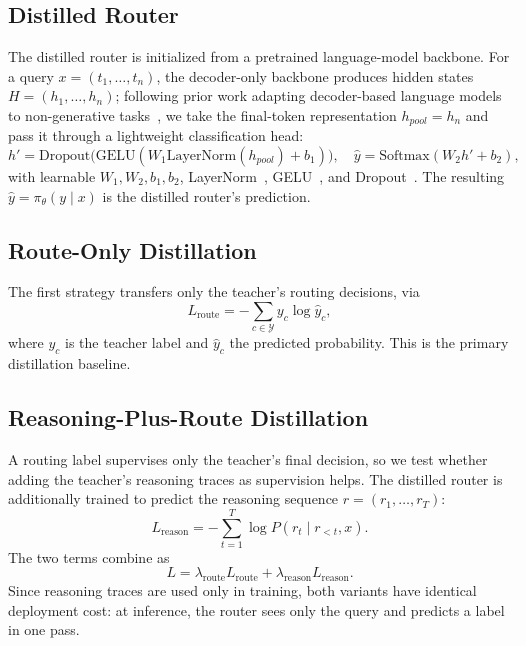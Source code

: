 \documentclass{article}
\begin{document}
\subsection{Distilled Router}
\label{sec:student-router}

The distilled router is initialized from a pretrained language-model backbone. For a query $x = (t_1, \ldots, t_n)$, the decoder-only backbone produces hidden states $H = (h_1, \ldots, h_n)$; following prior work adapting decoder-based language models to non-generative tasks~\citep{suganthan2025adapting}, we take the final-token representation $h_{pool} = h_n$ and pass it through a lightweight classification head:
\begin{equation}
h' = \text{Dropout} \Big( \text{GELU} ( W_1 \text{LayerNorm}(h_{pool}) + b_1 ) \Big), \quad \hat{y} = \text{Softmax} ( W_2 h' + b_2 ),
\label{eq:head}
\end{equation}
with learnable $W_1, W_2, b_1, b_2$, LayerNorm~\citep{ba2016layer}, GELU~\citep{hendrycks2016gelu}, and Dropout~\citep{srivastava2014dropout}. The resulting $\hat{y} = \pi_\theta(y \mid x)$ is the distilled router's prediction.

\subsection{Route-Only Distillation}
\label{sec:route-only}

The first strategy transfers only the teacher's routing decisions, via
\begin{equation}
L_{\text{route}} = -\sum_{c \in \mathcal{Y}} y_c \log \hat{y}_c,
\label{eq:lroute}
\end{equation}
where $y_c$ is the teacher label and $\hat{y}_c$ the predicted probability. This is the primary distillation baseline.

\subsection{Reasoning-Plus-Route Distillation}
\label{sec:reasoning-plus-route}

A routing label supervises only the teacher's final decision, so we test whether adding the teacher's reasoning traces as supervision helps. The distilled router is additionally trained to predict the reasoning sequence $r = (r_1, \ldots, r_T)$:
\begin{equation}
L_{\text{reason}} = -\sum_{t=1}^{T} \log P(r_t \mid r_{<t}, x).
\label{eq:lreason}
\end{equation}
The two terms combine as
\begin{equation}
L = \lambda_{\text{route}} L_{\text{route}} + \lambda_{\text{reason}} L_{\text{reason}}.
\label{eq:ltotal}
\end{equation}
Since reasoning traces are used only in training, both variants have identical deployment cost: at inference, the router sees only the query and predicts a label in one pass.
\end{document}
